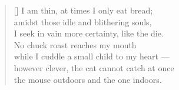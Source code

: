\documentclass[a4paper,12pt,twoside,final]{book}
\begin{document}
\newpage


\settowidth{\versewidth}{however clever, the cat cannot catch at once}

\begin{verse}[\versewidth]
  I am thin, at times I only eat bread; \\
  amidst those idle and blithering souls, \\
  I seek in vain more certainty, like the die. \\
  No chuck roast reaches my mouth \\
  while I cuddle a small child to my heart --- \\
  however clever, the cat cannot catch at once \\
  the mouse outdoors and the one indoors.
\end{verse}


\newpage

\settowidth{\versewidth}{számhoz s szivemhez kisgyerek ---}
\end{document}
